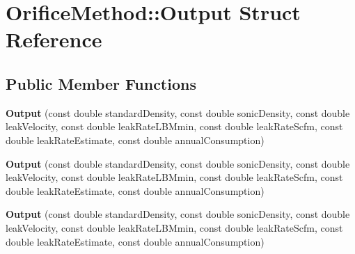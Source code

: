\hypertarget{struct_orifice_method_1_1_output}{}\section{Orifice\+Method\+:\+:Output Struct Reference}
\label{struct_orifice_method_1_1_output}
\subsection*{Public Member Functions}
\begin{DoxyCompactItemize}
\item 
\mbox{\label{struct_orifice_method_1_1_output_aacf8eac06000d98b5694668915059475}} 
{\bfseries Output} (const double standard\+Density, const double sonic\+Density, const double leak\+Velocity, const double leak\+Rate\+L\+B\+Mmin, const double leak\+Rate\+Scfm, const double leak\+Rate\+Estimate, const double annual\+Consumption)
\item 
\mbox{\label{struct_orifice_method_1_1_output_aacf8eac06000d98b5694668915059475}} 
{\bfseries Output} (const double standard\+Density, const double sonic\+Density, const double leak\+Velocity, const double leak\+Rate\+L\+B\+Mmin, const double leak\+Rate\+Scfm, const double leak\+Rate\+Estimate, const double annual\+Consumption)
\item 
\mbox{\label{struct_orifice_method_1_1_output_aacf8eac06000d98b5694668915059475}} 
{\bfseries Output} (const double standard\+Density, const double sonic\+Density, const double leak\+Velocity, const double leak\+Rate\+L\+B\+Mmin, const double leak\+Rate\+Scfm, const double leak\+Rate\+Estimate, const double annual\+Consumption)
\end{DoxyCompactItemize}
